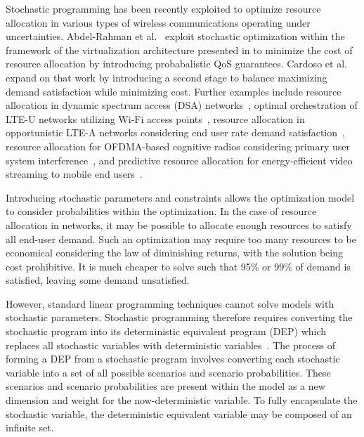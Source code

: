 \documentclass[12pt,dvipsnames]{report}
\begin{document}
Stochastic programming has been recently exploited to optimize resource allocation in various types of wireless communications operating under uncertainties.  Abdel-Rahman et al.~\cite{MJ_CCNC_16} exploit stochastic optimization within the framework of the virtualization architecture presented in  to minimize the cost of resource allocation by introducing probabalistic QoS guarantees.  Cardoso et al.~\cite{MJ_MECOMM_17} expand on that work by introducing a second stage to balance maximizing demand satisfaction while minimizing cost.  Further examples include resource allocation in dynamic spectrum access (DSA) networks~\cite{MJ_TW_13}, optimal orchestration of LTE-U networks utilizing Wi-Fi access points~\cite{MJ_WCNC_16}, resource allocation in opportunistic LTE-A networks considering end user rate demand satisfaction~\cite{MJ_DySPAN_15}, resource allocation for OFDMA-based cognitive radios considering primary user system interference~\cite{CC_OFDMA}, and predictive resource allocation for energy-efficient video streaming to mobile end users~\cite{CC_video}.

Introducing stochastic parameters and constraints allows the optimization model to consider probabilities within the optimization.  In the case of resource allocation in networks, it may be possible to allocate enough resources to satisfy all end-user demand.  Such an optimization may require too many resources to be economical considering the law of diminishing returns, with the solution being cost prohibitive.  It is much cheaper to solve such that 95\% or 99\% of demand is satisfied, leaving some demand unsatisfied.

However, standard linear programming techniques cannot solve models with stochastic parameters.  Stochastic programming therefore requires converting the stochastic program into its deterministic equivalent program (DEP) which replaces all stochastic variables with deterministic variables~\cite{stochprogramming}.  The process of forming a DEP from a stochastic program involves converting each stochastic variable into a set of all possible scenarios and scenario probabilities.  These scenarios and scenario probabilities are present within the model as a new dimension and weight for the now-deterministic variable.  To fully encapsulate the stochastic variable, the deterministic equivalent variable may be composed of an infinite set.
\end{document}
